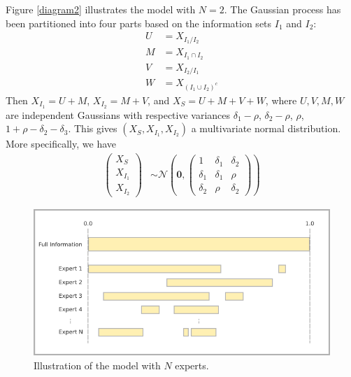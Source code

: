 \documentclass[11pt,twoside]{article}
\begin{document}
Figure \ref{diagram2} illustrates the model with $N=2$. The Gaussian process has been partitioned into four parts based on the information sets $I_1$ and $I_2$:
\begin{align*}
 U &= X_{I_1 / I_2}\\
M &= X_{I_1 \cap I_2}\\
V &= X_{I_2 / I_1}\\
W &= X_{(I_1 \cup I_2)^c}
\end{align*}
Then $X_{I_1} = U + M$, $X_{I_2} = M + V$, and $X_S = U+M+V+W$, where $U, V, M, W$ are independent Gaussians with respective variances $\delta_1-\rho$, $\delta_2-\rho$, $\rho$, $1+\rho-\delta_2 - \delta_3$. This gives $(X_{S}, X_{I_1}, X_{I_2})$ a multivariate normal distribution. More specifically, we have 
\begin{align}
\left(\begin{matrix} X_S \\ X_{I_1}\\ X_{I_2} \end{matrix}\right) &\sim \mathcal{N}\left(
 \boldsymbol{0},  \left(\begin{matrix} 
1 & \delta_1 & \delta_2\\
\delta_1 & \delta_1 &\rho\\
\delta_2 & \rho & \delta_2
 \end{matrix}\right)\right) \label{twoExperts}
\end{align}

\begin{figure}[htbp]
   \includegraphics[width = \textwidth]{N=N} %
   \caption{Illustration of the model with $N$ experts.}
   \label{diagramN}
\end{figure}
\end{document}
